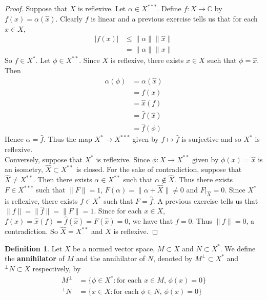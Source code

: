 \documentclass[12pt]{amsart}
\theoremstyle{definition}
\newtheorem{defn}[definition]{Definition}
\newcommand{\al}{\alpha}
\newcommand{\C}{\mathbb{C}}
\newcommand{\tbf}[1]{\textbf{#1}}
\DeclareMathOperator*{\0}{\mbf{0}}
\DeclareMathOperator*{\1}{\mbf{1}}
\begin{document}
	\begin{proof}
		Suppose that $X$ is reflexive. Let $\al \in X^{***}$. Define $f :X \rightarrow \C$ by $f(x) = \al(\hat{x})$. Clearly $f$ is linear and a previous exercise tells us that for each $x \in X$, 
		\begin{align*}
			\vert f(x) \vert 
			& \leq \|\al \|\|\hat{x} \|\\
			&= \|\al \|\|x \|
		\end{align*}
		So $f \in X^*$.
		Let $\phi \in X^{**}$. Since $X$ is reflexive, there exists $x \in X$ such that $\phi = \hat{x}$. Then 
		\begin{align*}
			\al(\phi)
			&= \al(\hat{x})\\
			&= f(x)\\
			&= \hat{x}(f)\\
			&= \hat{f}(\hat{x})\\
			&= \hat{f}(\phi)
		\end{align*}
		Hence $\al = \hat{f}$. Thus the map $X^* \rightarrow X^{***}$ given by $f \mapsto \hat{f} $ is surjective and so $X^{*}$ is reflexive.\vspace{.5cm}\\
		Conversely, suppose that $X^*$ is reflexive. Since $\phi:X \rightarrow X^{**}$ given by $\phi(x) = \hat{x}$ is an isometry, $\widehat{X} \subset X^{**}$ is closed. For the sake of contradiction, suppose that $\widehat{X} \neq X^{**}$. Then there exists $\al \in X^{**}$ such that $\al \not \in \widehat{X}$. Thus there exists $F \in X^{***}$ such that $\|F \|= 1$, $F(\al) = \|\al + \widehat{X} \|\neq 0$ and $F|_{\widehat{X}}=0$. Since $X^*$ is reflexive, there exists $f \in X^*$ such that $F = \hat{f}$. A previous exercise tells us that $\|f \|= \|\hat{f} \|= \|F \|= 1$. Since for each $x \in X$, $f(x) = \hat{x}(f) = \hat{f}(\hat{x}) = F(\hat{x}) = 0$, we have that $f = 0$. Thus $\|f \|= 0$, a contradiction. So $\widehat{X} = X^{**}$ and $X$ is reflexive.
		
	\end{proof}
	
	
	\begin{defn}
	Let $X$ be a normed vector space, $M \subset X$ and $N \subset X^*$. We define the \tbf{annihilator} of $M$ and the annihilator of $N$, denoted by $M^{\perp} \subset X^*$ and $^{\perp}N \subset X$ respectively, by 
	\begin{align*}
	 M^{\perp} &= \{\phi \in X^*: \text{for each $x \in M$, $\phi(x) = 0$}\} \\
	 ^{\perp}N &= \{x \in X: \text{for each $\phi \in N$, $\phi(x) = 0$}\}
	\end{align*}
	\end{defn}	
	
\end{document}
